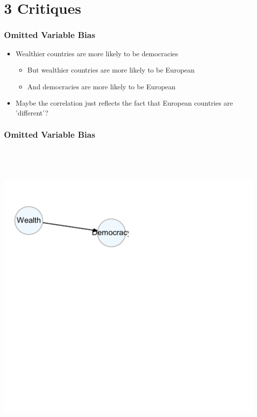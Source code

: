 \documentclass[xcolor=x11names,compress]{beamer}\usepackage[]{graphicx}\usepackage[]{color}
\newenvironment{knitrout}{}{} %
\renewcommand{\(}{\begin{columns}}
\renewcommand{\)}{\end{columns}}
\newcommand{\<}[1]{\begin{column}{#1}}
\renewcommand{\>}{\end{column}}
\begin{document}
\section{3 Critiques}

\begin{frame}
\frametitle{Omitted Variable Bias}
\begin{itemize}
\item Wealthier countries are more likely to be democracies
\pause
\begin{itemize}
\item But wealthier countries are more likely to be European
\pause
\item And democracies are more likely to be European
\pause
\end{itemize}
\item Maybe the correlation just reflects the fact that European countries are 'different'?
\end{itemize}
\end{frame}

\begin{frame}
\frametitle{Omitted Variable Bias}
\begin{knitrout}
\color{fgcolor}

{\centering \includegraphics[width=600,height=600]{figure/unnamed-chunk-1-1} 

}



\end{knitrout}
\end{frame}
\end{document}
